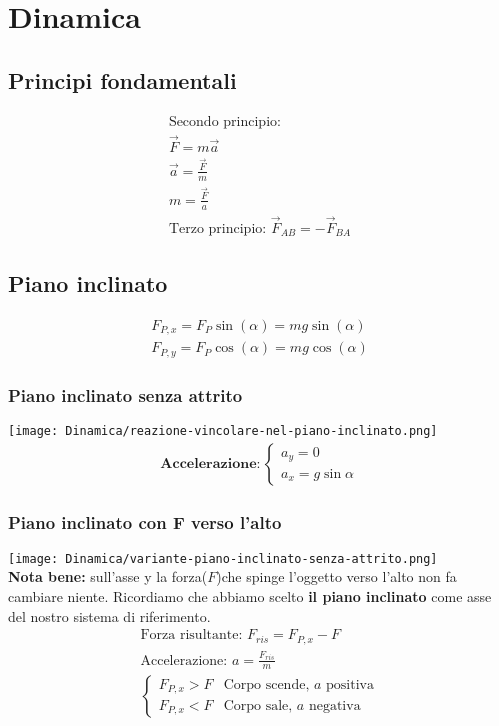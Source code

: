 \section{Dinamica}

\subsection{Principi fondamentali}
\begin{gather*}
    \text{Secondo principio: } \\
    \vec{F} = m \vec{a} \\
    \vec{a} = \frac{\vec{F}}{m} \\
    m = \frac{\vec{F}}{a} \\
    \text{Terzo principio: } \vec{F}_{AB} = -\vec{F}_{BA}
\end{gather*}

\subsection{Piano inclinato}
\begin{gather*}
    F_{P, x} = F_P \sin (\alpha) = m g \sin (\alpha) \\
    F_{P, y} = F_P \cos (\alpha) = m g \cos (\alpha)
\end{gather*}

\subsubsection{Piano inclinato senza attrito}
\texttt{[image: Dinamica/reazione-vincolare-nel-piano-inclinato.png]} \\
\begin{gather*}
    \textbf{Accelerazione}: \begin{cases}
        a_y = 0 \\
        a_x = g \sin{\alpha}
    \end{cases}
\end{gather*}

\subsubsection{Piano inclinato con F verso l'alto}
\texttt{[image: Dinamica/variante-piano-inclinato-senza-attrito.png]} \\
\textbf{Nota bene: } sull'asse y la forza($F$)che spinge l'oggetto verso l'alto non fa cambiare niente. Ricordiamo che abbiamo scelto \textbf{il piano inclinato} come asse del nostro sistema di riferimento.
\begin{gather*}
    \text{Forza risultante: } F_{ris} = F_{P, x} - F \\
    \text{Accelerazione: } a = \frac{F_{ris}}{m} \\
    \begin{cases}
        F_{P, x} > F & \text{Corpo scende, $a$ positiva} \\
        F_{P, x} < F & \text{Corpo sale, $a$ negativa}
    \end{cases}
\end{gather*}

